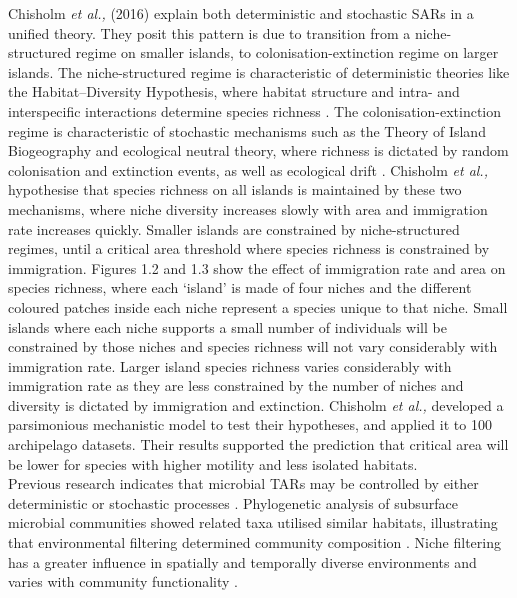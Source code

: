 \noindent Chisholm \textit{et al.,} (2016) explain both deterministic and stochastic SARs in a unified theory. They posit this pattern is due to transition from a niche-structured regime on smaller islands, to colonisation-extinction regime on larger islands. The niche-structured regime is characteristic of deterministic theories like the Habitat--Diversity Hypothesis, where habitat structure and intra- and interspecific interactions determine species richness \cite{chase2011disentangling}. The colonisation-extinction regime is characteristic of stochastic mechanisms such as the Theory of Island Biogeography and ecological neutral theory, where richness is dictated by random colonisation and extinction events, as well as ecological drift \cite{hubbell2001unified}. Chisholm \textit{et al.,} hypothesise that species richness on all islands is maintained by these two mechanisms, where niche diversity increases slowly with area and immigration rate increases quickly. Smaller islands are constrained by niche-structured regimes, until a critical area threshold where species richness is constrained by immigration. Figures 1.2 and 1.3 show the effect of immigration rate and area on species richness, where each `island' is made of four niches and the different coloured patches inside each niche represent a species unique to that niche. Small islands where each niche supports a small number of individuals will be constrained by those niches and species richness will not vary considerably with immigration rate. Larger island species richness varies considerably with immigration rate as they are less constrained by the number of niches and diversity is dictated by immigration and extinction. Chisholm \textit{et al.,} developed a parsimonious mechanistic model to test their hypotheses, and applied it to 100 archipelago datasets. Their results supported the prediction that critical area will be lower for species with higher motility and less isolated habitats. \\

\noindent Previous research indicates that microbial TARs may be controlled by either deterministic or stochastic processes \cite{StegenJamesC2012Sada}. Phylogenetic analysis of subsurface microbial communities showed related taxa utilised similar habitats, illustrating that environmental filtering determined community composition \cite{StegenJamesC2012Sada}. Niche filtering has a greater influence in spatially and temporally diverse environments and varies with community functionality \cite{StegenJamesC2012Sada} \cite{CarusoTancredi2011Sadp}. \\

